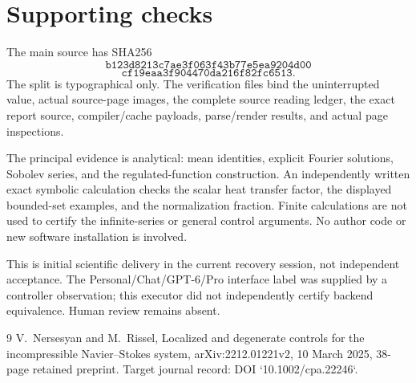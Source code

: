 \documentclass[10pt]{article}
\begin{document}
\section*{Supporting checks}
The main source has SHA256 \[\texttt{b123d8213c7ae3f063f43b77e5ea9204d00}\] \[\texttt{cf19eaa3f904470da216f82fc6513}.\] The split is typographical only. The verification files bind the uninterrupted value, actual source-page images, the complete source reading ledger, the exact report source, compiler/cache payloads, parse/render results, and actual page inspections.\par
The principal evidence is analytical: mean identities, explicit Fourier solutions, Sobolev series, and the regulated-function construction. An independently written exact symbolic calculation checks the scalar heat transfer factor, the displayed bounded-set examples, and the normalization fraction. Finite calculations are not used to certify the infinite-series or general control arguments. No author code or new software installation is involved.\par
This is initial scientific delivery in the current recovery session, not independent acceptance. The Personal/Chat/GPT-6/Pro interface label was supplied by a controller observation; this executor did not independently certify backend equivalence. Human review remains absent.\par
9 V. Nersesyan and M. Rissel, Localized and degenerate controls for the incompressible Navier–Stokes system, arXiv:2212.01221v2, 10 March 2025, 38-page retained preprint. Target journal record: DOI `10.1002/cpa.22246`.\par
\end{document}

